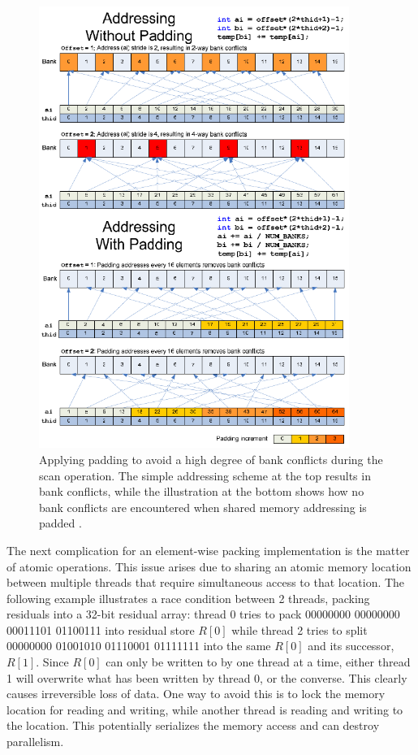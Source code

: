  \begin{figure}[h!]
  \begin{mdframed}
    \centering
    \includegraphics[width=0.9\textwidth]{avoidBankConflicts.png}
    \caption[Padding shared memory array indexing to avoid bank conflicts]{Applying padding to avoid a high degree of bank conflicts during the scan operation. The simple
    addressing scheme at the top results in bank conflicts, while the illustration at the bottom shows how no bank conflicts are encountered when shared memory addressing
    is padded \cite{harris2007parallel}.}
    \label{BANK_CONFLICTS}
  \end{mdframed}
  \end{figure} 
 
 The next complication for an element-wise packing implementation is the matter of atomic operations. This issue arises due to sharing an atomic memory location between multiple threads that require simultaneous access
 to that location. The following example illustrates a race condition between 2 threads, packing residuals into a 32-bit residual array: thread 0 tries to pack 00000000 00000000 00011101 01100111 into residual store 
 $R[0]$ while thread 2 tries to split 00000000 01001010 01110001 01111111 into the same $R[0]$ and its successor, $R[1]$. Since $R[0]$ can only be written to by one thread at a time, either thread 1 will overwrite what has
 been written by thread 0, or the converse. This clearly causes irreversible loss of data. One way to avoid this is to lock the memory location for reading and writing, while another thread is reading and writing to the 
 location. This potentially serializes the memory access and can destroy parallelism.
 
